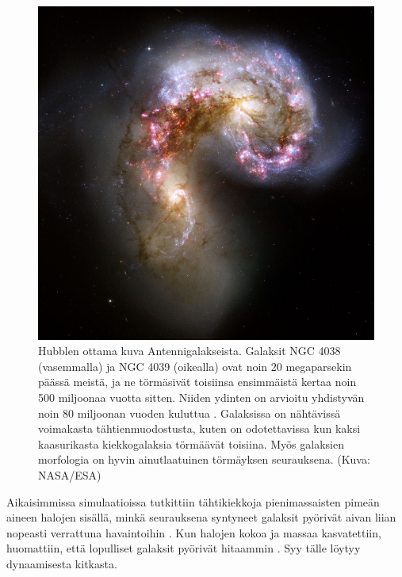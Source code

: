\documentclass[12pt,a4paper]{article}
\begin{document}
\begin{figure}[h!tb]
\centering
\includegraphics[width=\textwidth]{../kuvat/antenni.jpg}
\caption{Hubblen ottama kuva Antennigalakseista. Galaksit NGC 4038 (vasemmalla) ja NGC 4039 (oikealla) ovat noin 20 megaparsekin päässä meistä, ja ne törmäsivät toisiinsa ensimmäistä kertaa noin 500 miljoonaa vuotta sitten. Niiden ydinten on arvioitu yhdistyvän noin 80 miljoonan vuoden kuluttua \citep{lahen:2018}. Galaksissa on nähtävissä voimakasta tähtienmuodostusta, kuten on odotettavissa kun kaksi kaasurikasta kiekkogalaksia törmäävät toisiina. Myös galaksien morfologia on hyvin ainutlaatuinen törmäyksen seurauksena. (Kuva: NASA/ESA)}
\label{fig:antenni}
\end{figure}

Aikaisimmissa simulaatioissa tutkittiin tähtikiekkoja pienimassaisten pimeän aineen halojen sisällä, minkä seurauksena syntyneet galaksit pyörivät aivan liian nopeasti verrattuna havaintoihin \citep{gerhard:1981, farouki:1982, negroponte:1983}. Kun halojen kokoa ja massaa kasvatettiin, huomattiin, että lopulliset galaksit pyörivät hitaammin \citep{barnes:1988}. Syy tälle löytyy dynaamisesta kitkasta. 
\end{document}
